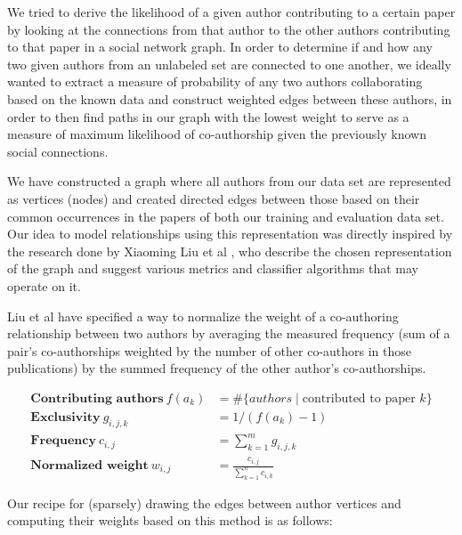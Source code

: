 
We tried to derive the likelihood of a given author contributing to a certain paper by looking at the connections from that author to the other authors contributing to that paper in a social network graph.
In order to determine if and how any two given authors from an unlabeled set are connected to one another, we ideally wanted to extract a measure of probability of any two authors collaborating based on the known data and construct weighted edges between these authors, in order to then find paths in our graph with the lowest weight to serve as a measure of maximum likelihood of co-authorship given the previously known social connections.

We have constructed a graph where all authors from our data set are represented as vertices (nodes) and created directed edges between those based on their common occurrences in the papers of both our training and evaluation data set.
Our idea to model relationships using this representation was directly inspired by the research done by Xiaoming Liu et al \cite{liu2005co}, who describe the chosen representation of the graph and suggest various metrics and classifier algorithms that may operate on it.

Liu et al have specified a way to normalize the weight of a co-authoring relationship between two authors by averaging the measured frequency (sum of a pair's co-authorships weighted by the number of other co-authors in those publications) by the summed frequency of the other author's co-authorships.

\begin{align*}
\textbf{Contributing authors}~
	f(a_k) &= \#\{ authors \mid \mbox{contributed to paper } k \} \\
\textbf{Exclusivity}~
	g_{i,j,k} &= 1 / (f(a_k)-1) \\
\textbf{Frequency}~
	c_{i,j} &= \sum_{k=1}^{m} g_{i,j,k} \\
\textbf{Normalized weight}~
	w_{i,j} &= \frac{c_{i,j}}{\sum_{k=1}^{n} c_{i,k}}
\end{align*}

Our recipe for (sparsely) drawing the edges between author vertices and computing their weights based on this method is as follows:


